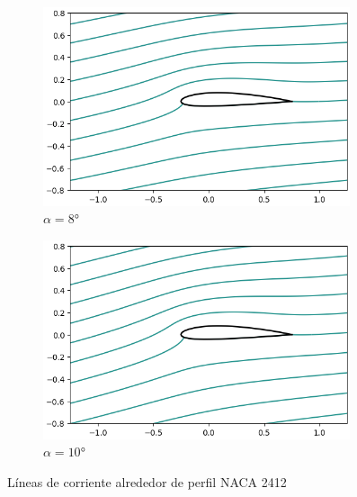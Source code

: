 \documentclass[letterpaper, openright, 12pt]{book}
\begin{document}
\begin{figure}[htbp!]
\begin{subfigure}[c]{0.48\textwidth}
            \includegraphics[keepaspectratio, width=0.99\textwidth]
                {./img/potential_flow_2412_stream_8}
            \caption{$\alpha = 8\si{\degree}$}
            \label{fig:potential_flow_2412_stream_8}
        \end{subfigure}
        \hfill
        \begin{subfigure}[c]{0.48\textwidth}
            \includegraphics[keepaspectratio, width=0.99\textwidth]
                {./img/potential_flow_2412_stream_10}
            \caption{$\alpha = 10\si{\degree}$}
        \end{subfigure}
        \caption{Líneas de corriente alrededor de perfil NACA 2412}
        \label{fig:potential_flow_2412_stream__1}
    \end{figure}
\end{document}
